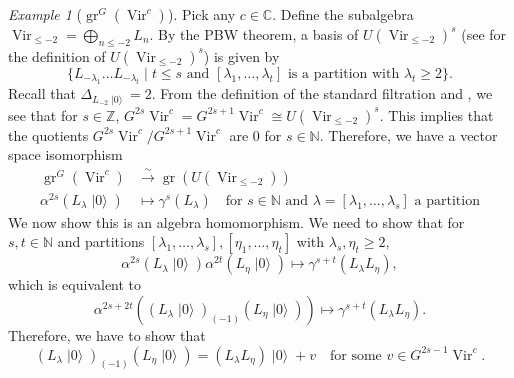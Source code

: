 \documentclass[a4paper, 12pt, reqno]{amsart}
\theoremstyle{remark}
\newtheorem{example}[theorem]{Example}
\numberwithin{equation}{subsection}
\DeclareMathOperator{\Vir}{Vir}
\DeclareMathOperator{\gr}{gr}
\DeclareMathOperator{\vac}{|0\rangle}
\begin{document}
\begin{example}[$\gr^G(\Vir^c)$]
  \label{exa:12}
  Pick any $c \in \mathbb{C}$.
  Define the subalgebra $\Vir_{\le -2} = \bigoplus_{n \le -2} L_{n}$.
  By the PBW theorem, a basis of $U(\Vir_{\le -2})^s$ (see  for the definition of $U(\Vir_{\le -2})^s$) is given by
  \begin{equation*}
    \{L_{-\lambda_1}\dots L_{-\lambda_t} \mid t \le s\text{ and }[\lambda_1, \dots, \lambda_t]\text{ is a partition with } \lambda_t \ge 2\}.
  \end{equation*}
  Recall that $\Delta_{L_{-2}\vac} = 2$.
  From the definition of the standard filtration and , we see that for $s \in \mathbb{Z}$, $G^{2s}\Vir^c = G^{2s + 1}\Vir^c \cong U(\Vir_{\le -2})^s$.
  This implies that the quotients $G^{2s}\Vir^c/G^{2s + 1}\Vir^c$ are $0$ for $s \in \mathbb{N}$.
  Therefore, we have a vector space isomorphism
  \begin{align*}
    \gr^G(\Vir^c) &\xrightarrow{\sim} \gr(U(\Vir_{\le -2})) \\
    \alpha^{2s}(L_{\lambda}\vac) &\mapsto \gamma^s(L_{\lambda}) \quad \text{for }s \in \mathbb{N}\text{ and }\lambda = [\lambda_1, \dots, \lambda_s] \text{ a partition}
  \end{align*}
  We now show this is an algebra homomorphism.
  We need to show that for $s, t \in \mathbb{N}$ and partitions $[\lambda_1, \dots, \lambda_s], [\eta_1, \dots, \eta_t]$ with $\lambda_s, \eta_t \ge 2$,
  \begin{equation*}
    \alpha^{2s}(L_{\lambda}\vac)\alpha^{2t}(L_{\eta}\vac) \mapsto \gamma^{s + t}(L_{\lambda}L_{\eta}),
  \end{equation*}
  which is equivalent to
  \begin{equation*}
    \alpha^{2s + 2t}((L_{\lambda}\vac)_{(-1)}(L_{\eta}\vac)) \mapsto \gamma^{s + t}(L_{\lambda}L_{\eta}).
  \end{equation*}
  Therefore, we have to show that
  \begin{equation}
    \label{eq:48}
    (L_{\lambda}\vac)_{(-1)}(L_{\eta}\vac) = (L_{\lambda}L_{\eta})\vac + v \quad \text{for some }v \in G^{2s - 1}\Vir^c.
  \end{equation}


\end{example}
\end{document}
